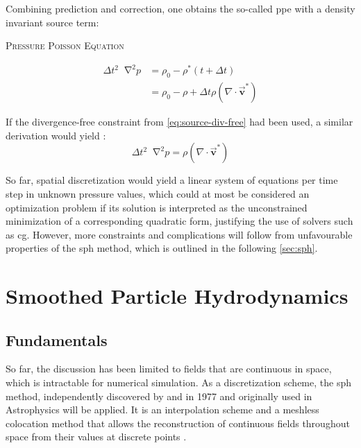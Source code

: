 \documentclass[conference]{IEEEtran}
\newcommand*\Laplace{\mathop{}\!\mathbin\nabla^2}
\newcommand\vek[1]{\vec{\bm{#1}}}
\newcommand\br[1]{\left(#1\right)}
\newcommand\divergence{{\nabla\cdot}}
\newcommand{\equationnamed}[2]{%
  \setlength{\fboxsep}{2pt} %
  \setlength{\fboxrule}{0.01pt}
  \begin{center}
    \begin{minipage}{\linewidth}
      \begin{center}\textsc{#1}\end{center}
      #2
    \end{minipage}
  \end{center}
}
\begin{document}
Combining prediction and correction, one obtains the so-called \ac{ppe} with a density invariant source term:
\equationnamed{Pressure Poisson Equation}{
  \begin{equation}\label{eq:ppe-rho-invariant}
    \begin{aligned}
      \Delta t^2 \Laplace p &= \rho_0 - \rho^*(t+\Delta t)\\
      &= \rho_0 - \rho + \Delta t \rho\br{\divergence \vek{v}^*}
    \end{aligned}
    \end{equation}
}

If the divergence-free constraint from \autoref{eq:source-div-free} had been used, a similar derivation would yield \cite{survey2022}:
\begin{equation}
  \Delta t^2 \Laplace p = \rho\br{\divergence\vek{v}^*}
\end{equation}

So far, spatial discretization would yield a linear system of equations per time step in unknown pressure values, which could at most be considered an optimization problem if its solution is interpreted as the unconstrained minimization of a corresponding quadratic form, justifying the use of solvers such as \ac{cg}. However, more constraints and complications will follow from unfavourable properties of the \ac{sph} method, which is outlined in the following \autoref{sec:sph}.  

\section{Smoothed Particle Hydrodynamics}\label{sec:sph}
\subsection{Fundamentals}\label{sec:sph-fundamentals}
So far, the discussion has been limited to fields that are continuous in space, which is intractable for numerical simulation. As a discretization scheme, the \acl{sph} method, independently discovered by \autocite[Gingold and Monaghan]{sph-monaghan-92} and \autocite[Lucy]{sph-monaghan-92} in 1977 and originally used in Astrophysics will be applied. It is an interpolation scheme and a meshless colocation method that allows the reconstruction of continuous fields throughout space from their values at discrete points \cite{duarte-meshless}.
\end{document}
